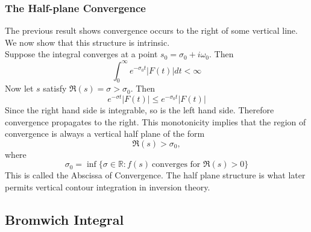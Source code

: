 \subsubsection{The Half-plane Convergence}
The previous result shows convergence occurs to the right of some vertical line. We now show that this structure is intrinsic. 
\\
Suppose the integral converges at a point $s_{0}=\sigma_{0}+i\omega_{0}$. Then $$\int^{\infty}_{0}e^{-\sigma_{0}t}|F(t)|dt<\infty$$ Now let $s$ satisfy $\Re(s)=\sigma>\sigma_{0}$. Then $$e^{-\sigma t}|F(t)|\leq e^{-\sigma_{0}t}|F(t)|$$ Since the right hand side is integrable, so is the left hand side. Therefore convergence propagates to the right. This monotonicity implies that the region of convergence is always a vertical half plane of the form $$\Re(s)>\sigma_{0},$$ where $$\sigma_{0}=\inf{\{\sigma\in\mathbb{R}:f(s)  \  \text{converges for }\Re(s)>0\}}$$ This is called the Abscissa of Convergence. The half plane structure is what later permits vertical contour integration in inversion theory. \cite{TransformsTheory,YellowBook,RedBook}











\subsection{Bromwich Integral}

